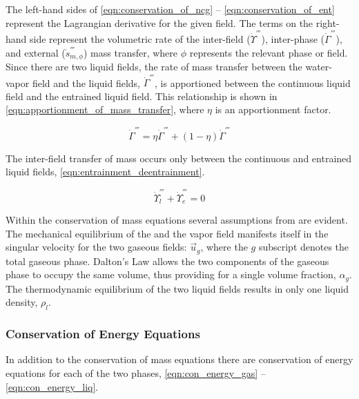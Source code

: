 The left-hand sides of \eqref{eqn:conservation_of_ncg} -- \eqref{eqn:conservation_of_ent} represent the Lagrangian derivative for the given field.
The terms on the right-hand side represent the volumetric rate of the inter-field ($\dot{\Upsilon}^{'''}$), inter-phase ($\dot{\Gamma}^{'''}$), and external ($\dot{s}^{'''}_{m,\phi}$) mass transfer, where $\phi$ represents the relevant phase or field.
Since there are two liquid fields, the rate of mass transfer between the water-vapor field and the liquid fields, $\dot{\Gamma}^{'''}$, is apportioned between the continuous liquid field and the entrained liquid field.
This relationship is shown in \eqref{eqn:apportionment_of_mass_transfer}, where $\eta$ is an apportionment factor. 

\begin{equation}
\label{eqn:apportionment_of_mass_transfer}
\dot{\Gamma}^{'''} = \eta \dot{\Gamma}^{'''} + (1 - \eta)\dot{\Gamma}^{'''}
\end{equation}

The inter-field transfer of mass occurs only between the continuous and entrained liquid fields, \eqref{eqn:entrainment_deentrainment}.

\begin{equation}
\label{eqn:entrainment_deentrainment}
\dot{\Upsilon}^{'''}_l + \dot{\Upsilon}^{'''}_e = 0
\end{equation}

Within the conservation of mass equations several assumptions from  are evident.
The mechanical equilibrium of the \ncg{} and the vapor field manifests itself in the singular velocity for the two gaseous fields: $\vec{u}_g$, where the $g$ subscript denotes the total gaseous phase.
Dalton's Law allows the two components of the gaseous phase to occupy the same volume, thus providing for a single volume fraction, $\alpha_g$.
The thermodynamic equilibrium of the two liquid fields results in only one liquid density, $\rho_l$.

\subsubsection{Conservation of Energy Equations}
\label{subsubsect:energy_equations}

In addition to the conservation of mass equations there are conservation of energy equations for each of the two phases, \eqref{eqn:con_energy_gas} -- \eqref{eqn:con_energy_liq}.

